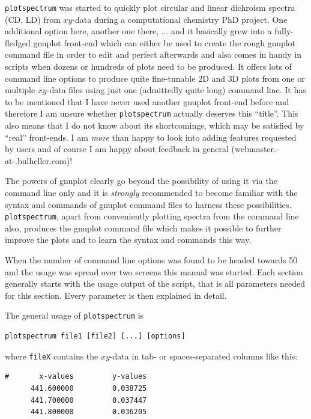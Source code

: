 \documentclass[12pt, a4paper]{article}
\begin{document}
\verb'plotspectrum' was started to quickly plot circular and linear dichroism spectra (CD, LD) from $xy$-data during a computational chemistry PhD project. One additional option here, another one there, ... and it basically grew into a fully-fledged gnuplot front-end which can either be used to create the rough gnuplot command file in order to edit and perfect afterwards and also comes in handy in scripts when dozens or hundreds of plots need to be produced. It offers lots of command line options to produce quite fine-tunable 2D and 3D plots from one or multiple $xy$-data files using just one (admittedly quite long) command line. It has to be mentioned that I have never used another gnuplot front-end before and therefore I am unsure whether \verb'plotspectrum' actually deserves this ``title''. This also means that I do not know about its shortcomings, which may be satisfied by ``real'' front-ends. I am \emph{more} than happy to look into adding features requested by users and of course I am happy about feedback in general (webmaster.-at-.bulheller.com)!

The powers of gnuplot clearly go beyond the possibility of using it via the command line only and it is \emph{strongly} recommended to become familiar with the syntax and commands of gnuplot command files to harness these possibilities. \verb'plotspectrum', apart from conveniently plotting spectra from the command line also, produces the gnuplot command file which makes it possible to further improve the plots and to learn the syntax and commands this way.

When the number of command line options was found to be headed towards 50 and the usage was spread over two screens this manual was started. Each section generally starts with the usage output of the script, that is all parameters needed for this section. Every parameter is then explained in detail.

The general usage of \verb'plotspectrum' is

\begin{verbatim}
plotspectrum file1 [file2] [...] [options]
\end{verbatim}

where \verb'fileX' contains the $xy$-data in tab- or spaces-separated columns like this:

\begin{verbatim}
#       x-values         y-values
      441.600000         0.038725
      441.700000         0.037447
      441.800000         0.036205
\end{verbatim}
\end{document}
